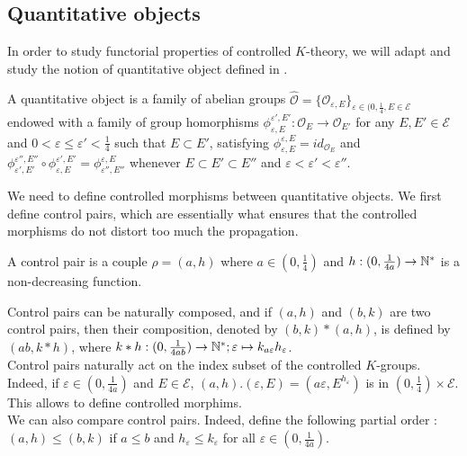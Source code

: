 \subsection{Quantitative objects}
In order to study functorial properties of controlled $K$-theory, we will adapt and study the notion of quantitative object defined in \cite{OY2}.\\

\begin{definition}
A quantitative object is a family of abelian groups $\hat{\mathcal{O}}=\{\mathcal{O}_{\varepsilon, E}\}_{\varepsilon\in (0,\frac{1}{4}, E\in\mathcal{E}}$ endowed with a family of group homorphisms $\phi_{\varepsilon, E}^{\varepsilon', E'} : \mathcal{O}_E\rightarrow \mathcal{O}_{E'}$ for any $E,E'\in\mathcal E$ and $0<\varepsilon\leq \varepsilon'<\frac{1}{4}$ such that $E\subset E'$, satisfying $\phi_{\varepsilon, E}^{\varepsilon, E}= id_{\mathcal{O}_E}$ and $\phi_{\varepsilon', E'}^{\varepsilon'', E''}\circ \phi_{\varepsilon, E}^{\varepsilon', E'} =\phi_{\varepsilon'', E''}^{\varepsilon, E}$ whenever $E\subset E' \subset E''$ and $\varepsilon<\varepsilon'<\varepsilon''$.
\end{definition}

We need to define controlled morphisms between quantitative objects. We first define control pairs, which are essentially what ensures that the controlled morphisms do not distort too much the propagation.\\

\begin{definition}
A control pair is a couple $\rho=(a,h)$ where $a\in (0,\frac{1}{4})$ and $h : (0,\frac{1}{4a})\rightarrow \mathbb N^*$ is a non-decreasing function. 
\end{definition}

Control pairs can be naturally composed, and if $(a,h)$ and $(b,k)$ are two control pairs, then their composition, denoted by $(b,k)\ast(a,h)$, is defined by $(ab,k\ast h)$, where $k\ast h : (0,\frac{1}{4ab})\rightarrow \mathbb N^* ; \varepsilon \mapsto k_{a \varepsilon}h_\varepsilon$. \\

Control pairs naturally act on the index subset of the controlled $K$-groups. Indeed, if $\varepsilon\in (0,\frac{1}{4a})$ and $E\in\mathcal E$, $(a,h).(\varepsilon,E)= (a\varepsilon,E^{h_\varepsilon})$ is in $(0,\frac{1}{4})\times\mathcal E$. This allows to define controlled morphims.\\

We can also compare control pairs. Indeed, define the following partial order : $(a,h) \leq (b,k)$ if $a \leq b$ and $h_\varepsilon\leq k_\varepsilon$ for all $\varepsilon\in (0,\frac{1}{4a})$.\\ 

